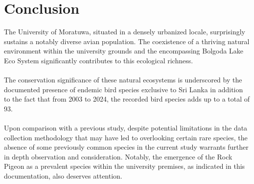 \chapter{Conclusion}

The University of Moratuwa, situated in a densely urbanized locale, surprisingly sustains a notably diverse avian population. The coexistence of a thriving natural environment within the university grounds and the encompassing Bolgoda Lake Eco System significantly contributes to this ecological richness.
\\\\
The conservation significance of these natural ecosystems is underscored by the documented presence of endemic bird species exclusive to Sri Lanka in addition to the fact that from 2003 to 2024, the recorded bird species adds up to a total of 93.
\\\\
Upon comparison with a previous study, despite potential limitations in the data collection methodology that may have led to overlooking certain rare species, the absence of some previously common species in the current study warrants further in depth observation and consideration. Notably, the emergence of the Rock Pigeon as a prevalent species within the university premises, as indicated in this documentation, also deserves attention.
